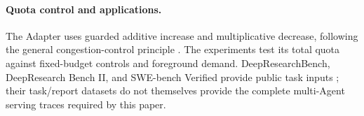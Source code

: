 \paragraph{Quota control and applications.}
The Adapter uses guarded additive increase and multiplicative decrease,
following the general congestion-control principle \cite{chiu1989aimd}.
The experiments test its total quota against fixed-budget controls and
foreground demand. DeepResearchBench, DeepResearch Bench II, and
SWE-bench Verified provide public task inputs
\cite{du2025deepresearch,li2026deepresearchii,swebenchverified};
their task/report datasets do not themselves provide the complete
multi-Agent serving traces required by this paper.
